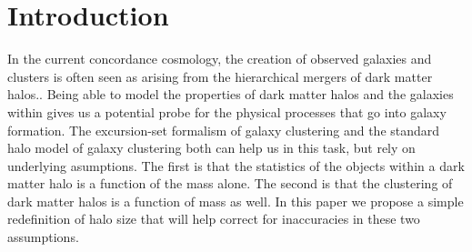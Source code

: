 \documentclass[usenatbib,usegraphicx,letterpaper]{mn2e}
\begin{document}

\section{Introduction}
\label{section:introduction}


In the current concordance cosmology, the creation of observed galaxies and clusters is often seen as arising from the hierarchical mergers of dark matter halos.\citep{white78}. Being able to model the properties of dark matter halos and the galaxies within gives us a potential probe for the physical processes that go into galaxy formation. The excursion-set formalism of galaxy clustering \citep{bond91,lacey93,somerville99, zentner06} and the standard halo model of galaxy clustering \citep{seljak00, peacock00, scoccimarro01, berlind02, bullock02, cooray02} both can help us in this task, but rely on underlying asumptions. The first is that the statistics of the objects within a dark matter halo is a function of the mass alone. The second is that the clustering of dark matter halos is a function of mass as well. In this paper we propose a simple redefinition of halo size that will help correct for inaccuracies in these two assumptions.
\end{document}
